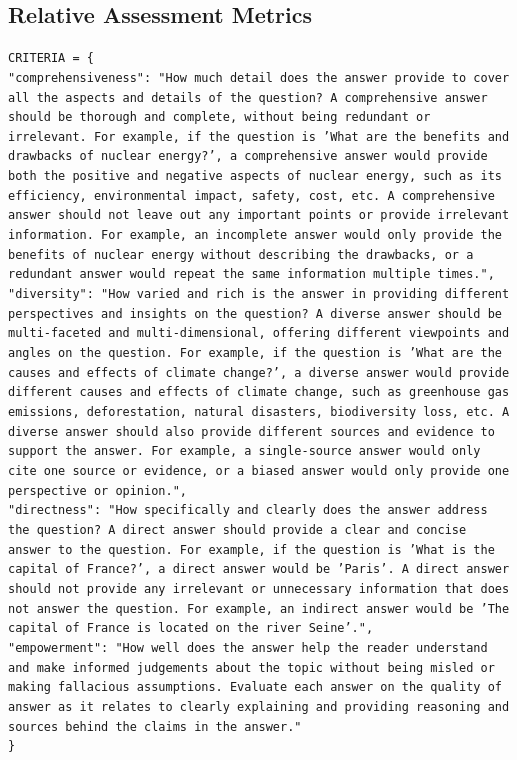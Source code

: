 \subsection{Relative Assessment Metrics}

\texttt{CRITERIA = \{\\
    "comprehensiveness": "How much detail does the answer provide to cover all the aspects and details of the question? A comprehensive answer should be thorough and complete, without being redundant or irrelevant. For example, if the question is 'What are the benefits and drawbacks of nuclear energy?', a comprehensive answer would provide both the positive and negative aspects of nuclear energy, such as its efficiency, environmental impact, safety, cost, etc. A comprehensive answer should not leave out any important points or provide irrelevant information. For example, an incomplete answer would only provide the benefits of nuclear energy without describing the drawbacks, or a redundant answer would repeat the same information multiple times.",\\
    "diversity": "How varied and rich is the answer in providing different perspectives and insights on the question? A diverse answer should be multi-faceted and multi-dimensional, offering different viewpoints and angles on the question. For example, if the question is 'What are the causes and effects of climate change?', a diverse answer would provide different causes and effects of climate change, such as greenhouse gas emissions, deforestation, natural disasters, biodiversity loss, etc. A diverse answer should also provide different sources and evidence to support the answer. For example, a single-source answer would only cite one source or evidence, or a biased answer would only provide one perspective or opinion.",\\
    "directness": "How specifically and clearly does the answer address the question? A direct answer should provide a clear and concise answer to the question. For example, if the question is 'What is the capital of France?', a direct answer would be 'Paris'. A direct answer should not provide any irrelevant or unnecessary information that does not answer the question. For example, an indirect answer would be 'The capital of France is located on the river Seine'.",\\
    "empowerment": "How well does the answer help the reader understand and make informed judgements about the topic without being misled or making fallacious assumptions. Evaluate each answer on the quality of answer as it relates to clearly explaining and providing reasoning and sources behind the claims in the answer."\\
\}}